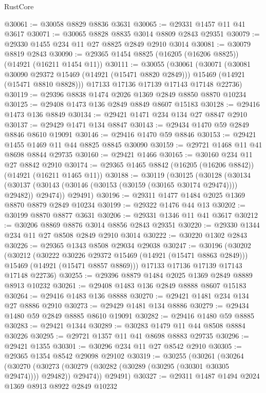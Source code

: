 \begin{lexlean}{RustCore}
\begin{coremodule}
@30061 := @30058 @8829 @8836 @3631
@30065 := @29331 @1457 @11 @41 @3617
@30071 := @30065 @8828 @8835 @3014 @8809 @2843 @29351
@30079 := @29330 @1455 @234 @11 @27 @8825 @2849 @2910 @3014
@30081 := @30079 @8819 @2843
@30090 := @29365 @1454 @8825 (@16205 (@16206 @8825)) (@14921 (@16211 @1454 @11))
@30111 := @30055
    (@30061
      (@30071
        (@30081 @30090 @29372 @15469 (@14921 (@15471 @8820 @2849)))
        @15469
        (@14921 (@15471 @8810 @8828)))
      @17133
      @17136
      @17139
      @17143
      @17148
      @22736)
@30119 := @29396 @8838 @1474 @2026 @1369 @2849 @8850 @8870 @10234
@30125 := @29408 @1473 @136 @2849 @8849 @8607 @15183
@30128 := @29416 @1473 @136 @8849
@30134 := @29421 @1471 @234 @134 @27 @8847 @2910
@30137 := @29429 @1471 @134 @8847
@30143 := @29434 @1470 @59 @2849 @8846 @8610 @19091
@30146 := @29416 @1470 @59 @8846
@30153 := @29421 @1455 @1469 @11 @44 @8825 @8845 @30090
@30159 := @29721 @1468 @11 @41 @8698 @8844 @29735
@30160 := @29421 @1466
@30165 := @30160 @234 @11 @27 @8842 @2910
@30174 := @29365 @1465 @8842 (@16205 (@16206 @8842)) (@14921 (@16211 @1465 @11))
@30188 := @30119
    (@30125
      (@30128
        (@30134 (@30137 (@30143 (@30146 (@30153 (@30159 (@30165 @30174 @29474)))) @29482)) @29474))
      @29491)
@30196 := @29311 @1477 @1484 @2025 @1369 @8870 @8879 @2849 @10234
@30199 := @29322 @1476 @44 @13
@30202 := @30199 @8870 @8877 @3631
@30206 := @29331 @1346 @11 @41 @3617
@30212 := @30206 @8869 @8876 @3014 @8856 @2843 @29351
@30220 := @29330 @1344 @234 @11 @27 @8508 @2849 @2910 @3014
@30222 := @30220 @1302 @2843
@30226 := @29365 @1343 @8508 @29034 @29038
@30247 := @30196
    (@30202
      (@30212
        (@30222 @30226 @29372 @15469 (@14921 (@15471 @8863 @2849)))
        @15469
        (@14921 (@15471 @8857 @8869)))
      @17133
      @17136
      @17139
      @17143
      @17148
      @22736)
@30255 := @29396 @8879 @1484 @2025 @1369 @2849 @8889 @8913 @10232
@30261 := @29408 @1483 @136 @2849 @8888 @8607 @15183
@30264 := @29416 @1483 @136 @8888
@30270 := @29421 @1481 @234 @134 @27 @8886 @2910
@30273 := @29429 @1481 @134 @8886
@30279 := @29434 @1480 @59 @2849 @8885 @8610 @19091
@30282 := @29416 @1480 @59 @8885
@30283 := @29421 @1344
@30289 := @30283 @1479 @11 @44 @8508 @8884 @30226
@30295 := @29721 @1357 @11 @41 @8698 @8883 @29735
@30296 := @29421 @1355
@30301 := @30296 @234 @11 @27 @8542 @2910
@30305 := @29365 @1354 @8542 @29098 @29102
@30319 := @30255
    (@30261
      (@30264
        (@30270 (@30273 (@30279 (@30282 (@30289 (@30295 (@30301 @30305 @29474)))) @29482)) @29474))
      @29491)
@30327 := @29311 @1487 @1494 @2024 @1369 @8913 @8922 @2849 @10232

\end{coremodule}
\end{lexlean}
